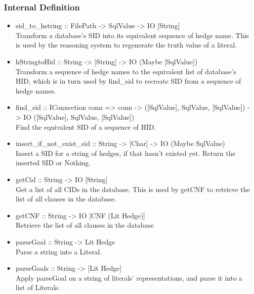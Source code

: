 \documentclass[../gr-final.tex]{subfiles}
\begin{document}
\subsubsection{Internal Definition}
\begin{itemize}
        \item sid\_to\_hstring :: FilePath -> SqlValue -> IO
                [String]\\
                Transform a database's SID into its equivalent
                sequence of hedge name. This is used by the reasoning
                system to regenerate the truth value of a
                literal.                
        \item hStringtoHid :: String -> [String] -> IO (Maybe
                [SqlValue])\\
                Transform a sequence of hedge names to the equivalent
                list of database's HID, which is in turn used by find\_sid to
                recreate SID from a sequence of hedge names.
        \item find\_sid :: IConnection conn => conn -> ([SqlValue], SqlValue,
                 [SqlValue]) -> IO ([SqlValue], SqlValue,
                 [SqlValue])\\
                 Find the equivalent SID of a sequence of HID.
        \item insert\_if\_not\_exist\_sid :: String -> [Char] -> IO (Maybe
                 SqlValue)\\
                 Insert a SID for a string of hedges, if that
                 hasn't existed yet. Return the inserted SID or
                 Nothing.
        \item getCid :: String -> IO [String]\\
                Get a list of all CIDs in the database. This is
                used by getCNF to retrieve the list of all
                clauses in the database.
        \item getCNF :: String -> IO [CNF (Lit Hedge)]\\
                Retrieve the list of all clauses in the database
        \item parseGoal :: String -> Lit Hedge\\
                Parse a string into a Literal.
        \item parseGoals :: String -> [Lit Hedge]\\
                Apply parseGoal on a string of literals'
                representations, and parse it into a list of
                Literals.

\end{itemize}
\end{document}
